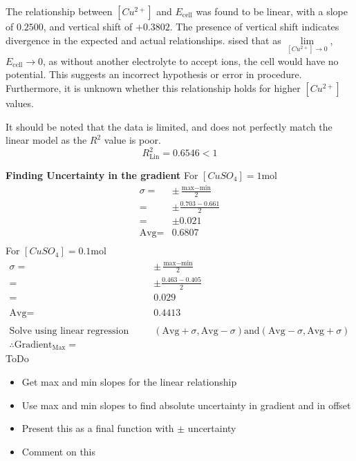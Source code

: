 \documentclass[11pt,a4paper]{article}
\begin{document}

The relationship between $[Cu^{2+}]$ and $E_\textrm{cell}$ was found to be linear, with a slope of $0.2500$, and vertical shift of $+0.3802$. The presence of vertical shift indicates divergence in the expected and actual relationships. sised that as $\lim\limits_{[Cu^{2+}]\rightarrow 0}$, $E_\textrm{cell}\rightarrow 0$, as without another electrolyte to accept ions, the cell would have no potential. This suggests an incorrect hypothesis or error in procedure. Furthermore, it is unknown whether this relationship holds for higher $[Cu^{2+}]$ values.

It should be noted that the data is limited, and does not perfectly match the linear model as the $R^2$ value is poor.
$$R^2_\textrm{Lin}=0.6546<1$$

\textbf{Finding Uncertainty in the gradient}\newline
For $[CuSO_4]=1$mol\newline
\begin{align*}
	\sigma=&\pm\frac{\textrm{max}-\textrm{min}}{2}\\
	=&\pm\frac{0.703-0.661}{2}\\
	=&\pm0.021\\
	\textrm{Avg}=&0.6807\\
\end{align*}
For $[CuSO_4]=0.1$mol\newline
\begin{align*}
	\sigma=&\pm\frac{\textrm{max}-\textrm{min}}{2}\\
	=&\pm\frac{0.463-0.405}{2}\\
	=&0.029\\
	\\
	\textrm{Avg}=&0.4413\\
	&\\
	\textrm{Solve using linear regression between} &(\textrm{Avg}+\sigma, \textrm{Avg}-\sigma) \textrm{and}(\textrm{Avg}-\sigma, \textrm{Avg}+\sigma) \\
	\therefore \textrm{Gradient}_\textrm{Max}=&
\end{align*}
ToDo
\begin{itemize}
	\item Get max and min slopes for the linear relationship 
	\item Use max and min slopes to find absolute uncertainty in gradient and in offset
	\item Present this as a final function with $\pm$ uncertainty
	\item Comment on this
\end{itemize}
\end{document}
